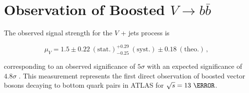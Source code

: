 \section{Observation of Boosted $V \rightarrow b\bar{b}$} \label{sec:results:v_jets}

The observed signal strength for the $V$ + jets process is

$$ \mu_{V} = 1.5 \pm 0.22~\mathrm{(stat.)}^{+0.29}_{-0.25}~\mathrm{(syst.)} \pm 0.18~\mathrm{(theo.)}\,, $$

corresponding to an observed significance of $5\sigma$ with an expected
significance of $4.8\sigma$ \Cite{Feickert:HiggsCouplings2018}.  This
measurement represents the first direct observation of boosted vector bosons
decaying to bottom quark pairs in ATLAS for $\sqrt{s} = 13~\TeV$.
